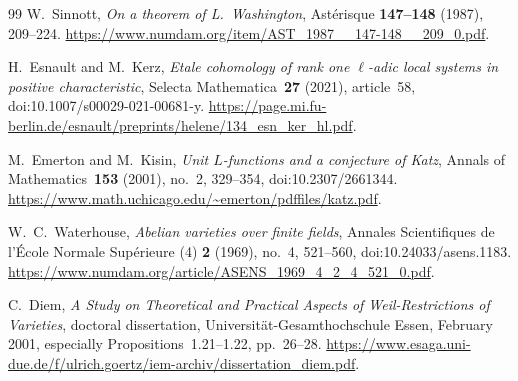 \begin{thebibliography}{99}
W.~Sinnott,
\emph{On a theorem of L.~Washington},
Ast\'erisque \textbf{147--148} (1987), 209--224.
\url{https://www.numdam.org/item/AST_1987__147-148__209_0.pdf}.

H.~Esnault and M.~Kerz,
\emph{Etale cohomology of rank one $\ell$-adic local systems in positive characteristic},
Selecta Mathematica~\textbf{27} (2021), article~58,
doi:10.1007/s00029-021-00681-y.
\url{https://page.mi.fu-berlin.de/esnault/preprints/helene/134_esn_ker_hl.pdf}.

M.~Emerton and M.~Kisin,
\emph{Unit $L$-functions and a conjecture of Katz},
Annals of Mathematics~\textbf{153} (2001), no.~2, 329--354,
doi:10.2307/2661344.
\url{https://www.math.uchicago.edu/~emerton/pdffiles/katz.pdf}.

W.~C.~Waterhouse,
\emph{Abelian varieties over finite fields},
Annales Scientifiques de l'\'Ecole Normale Sup\'erieure (4)
\textbf{2} (1969), no.~4, 521--560,
doi:10.24033/asens.1183.
\url{https://www.numdam.org/article/ASENS_1969_4_2_4_521_0.pdf}.

C.~Diem,
\emph{A Study on Theoretical and Practical Aspects of Weil-Restrictions
of Varieties}, doctoral dissertation, Universit\"at-Gesamthochschule
Essen, February 2001, especially Propositions~1.21--1.22, pp.~26--28.
\url{https://www.esaga.uni-due.de/f/ulrich.goertz/iem-archiv/dissertation_diem.pdf}.

\end{thebibliography}
